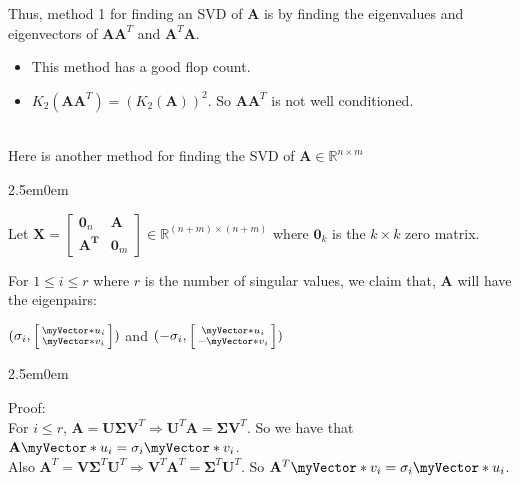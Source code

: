 \documentclass{book}
\newcommand{\hTwo}{%
   \color{MidnightBlue}%
   \fontsize{13}{15}\selectfont%
}
\newcommand{\hThree}{%
   \color{PineGreen}
   \fontsize{13}{15}\selectfont%
}
\newenvironment{myIndent}{%
   \begin{adjustwidth}{2.5em}{0em}%
}{%
   \end{adjustwidth}%
}
\newcommand{\mySepTwo}[1][.]{%
   {\noindent\color{#1}{\rule{6.5in}{0.5mm}}}\\%
}
\newcommand{\retTwo}{\hfill\bigbreak}
\newcommand{\mVecAst}[1]{\myVector*{#1}}
\newcommand{\mMat}[1]{\mathbf{#1}}
\begin{document}
   Thus, method 1 for finding an SVD of $\mMat{A}$ is by finding the eigenvalues and\\ eigenvectors of $\mMat{A}\mMat{A}^T$ and $\mMat{A}^T\mMat{A}$.
   \begin{itemize}
      \item This method has a good flop count.
      \item $K_2(\mMat{A}\mMat{A}^T) = (K_2(\mMat{A}))^2$. So $\mMat{A}\mMat{A}^T$ is not well conditioned.
   \end{itemize}

   \mySepTwo

   Here is another method for finding the SVD of $\mMat{A} \in \mathbb{R}^{n\times m}$\retTwo
   {\begin{myIndent} \hTwo
      Let $ \mMat{X} = 
      \begin{bmatrix}
         \mMat{0}_n & \mMat{A} \\
         \mMat{A^T} & \mMat{0}_m
      \end{bmatrix} \in \mathbb{R}^{(n+m)\times(n+m)}$ where $\mMat{0}_k$ is the $k\times k$ zero matrix. \retTwo

      For $1 \leq i \leq r$ where $r$ is the number of singular values, we claim that, $\mMat{A}$ will have the eigenpairs:
      
      {\centering$(\sigma_i, 
      \left[\begin{smallmatrix}
         \mVecAst{u}_i \\ \mVecAst{v}_i
      \end{smallmatrix}\right])$ and $(-\sigma_i, 
      \left[\begin{smallmatrix}
         \mVecAst{u}_i \\ -\mVecAst{v}_i
      \end{smallmatrix}\right])$\par}

      \newpage
   
      {\begin{myIndent} \hThree
         Proof:\\
         For $i \leq r$, $\mMat{A} = \mMat{U}\bm{\Sigma}\mMat{V}^T \Longrightarrow \mMat{U}^T\mMat{A} = \bm{\Sigma}\mMat{V}^T$. So we have that $\mMat{A}\mVecAst{u}_i = \sigma_i\mVecAst{v}_i$.\\
         Also $\mMat{A}^T = \mMat{V}\bm{\Sigma}^T\mMat{U}^T \Longrightarrow \mMat{V}^T\mMat{A}^T = \bm{\Sigma}^T\mMat{U}^T$. So $\mMat{A}^T\mVecAst{v}_i = \sigma_i\mVecAst{u}_i$. \retTwo


\end{myIndent}}
\end{myIndent}}
\end{document}
